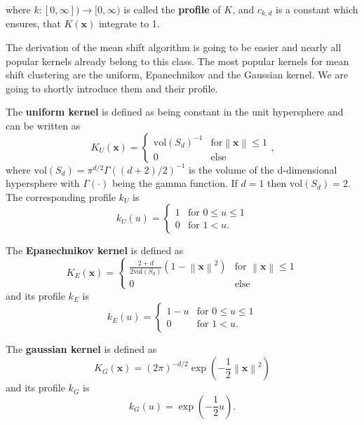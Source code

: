 \documentclass{article}
\newcommand{\norm}[1]{\left\lVert#1\right\rVert}
\begin{document}
where $k : [0, \infty]) \rightarrow [0, \infty)$ is called the \textbf{profile} of $K$, and $c_{k,d}$ is a constant which ensures, that $K(\bm{x})$ integrate to 1.

The derivation of the mean shift algorithm is going to be easier and nearly all popular kernels already belong to this class. The most popular kernels for mean shift clustering are the uniform, Epanechnikov and the Gaussian kernel. We are going to shortly introduce them and their profile.

The \textbf{uniform kernel} is defined as being constant in the unit hypersphere and can be written as
\begin{equation}
	K_U(\bm{x}) = \begin{cases}
		\text{vol}(S_d)^{-1} & \text{for} \norm{\bm{x}} \leq 1\\
		0 & \text{else}
	\end{cases}\text{,}
\end{equation}
where $\text{vol}(S_d) = \pi^{d/2}\Gamma((d+2)/2)^{-1}$ is the volume of the d-dimensional hypersphere with $\Gamma(\cdot)$ being the gamma function. If $d=1$ then $\text{vol}(S_d)=2$. The corresponding profile $k_U$ is
\begin{equation}
	k_U(u) = \begin{cases}
		1 & \text{for } 0 \leq u \leq 1\\
		0 & \text{for } 1 < u\text{.}
	\end{cases}
\end{equation}

The \textbf{Epanechnikov kernel} is defined as
\begin{equation}
	K_E(\bm{x}) = \begin{cases}
		\frac{2 + d}{2 \text{vol}(S_d)} (1 - \norm{\bm{x}}^2) & \text{for } \norm{\bm{x}} \leq 1\\
		0 & \text{else}
	\end{cases}
\end{equation}
and its profile $k_E$ is
\begin{equation}
	k_E(u) = \begin{cases}
		1 - u & \text{for } 0 \leq u \leq 1\\
		0 & \text{for } 1 < u\text{.}
	\end{cases}
\end{equation}

The \textbf{gaussian kernel} is defined as
\begin{equation}
	K_G(\bm{x}) = (2 \pi)^{-d/2} \exp\left(-\frac{1}{2} \norm{\bm{x}}^2\right)
\end{equation}
and its profile $k_G$ is
\begin{equation}
	k_G(u) = \exp\left(-\frac{1}{2}u\right)\text{.}
\end{equation}
\end{document}

